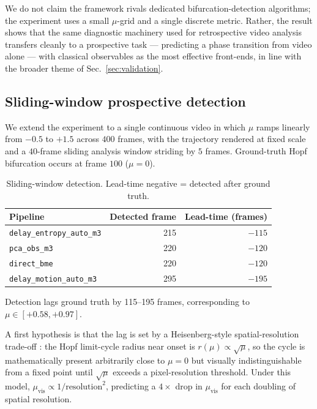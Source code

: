 \documentclass[11pt,a4paper]{article}
\begin{document}
We do not claim the framework rivals dedicated bifurcation-detection
algorithms; the experiment uses a small $\mu$-grid and a single
discrete metric. Rather, the result shows that the same diagnostic
machinery used for retrospective video analysis transfers cleanly to
a prospective task --- predicting a phase transition from video alone
--- with classical observables as the most effective front-ends, in
line with the broader theme of Sec.~\ref{sec:validation}.

\subsection{Sliding-window prospective detection}

We extend the experiment to a single continuous video in which $\mu$
ramps linearly from $-0.5$ to $+1.5$ across $400$ frames, with the
trajectory rendered at fixed scale and a $40$-frame sliding analysis
window striding by $5$ frames. Ground-truth Hopf bifurcation occurs
at frame $100$ ($\mu = 0$).

\begin{table}[h]
\centering
\caption{Sliding-window detection. Lead-time negative = detected
after ground truth.}
\label{tab:sliding-bifurc}
\begin{tabular}{lrr}
\toprule
Pipeline & Detected frame & Lead-time (frames) \\
\midrule
\texttt{delay\_entropy\_auto\_m3} & 215 & $-115$ \\
\texttt{pca\_obs\_m3} & 220 & $-120$ \\
\texttt{direct\_bme} & 220 & $-120$ \\
\texttt{delay\_motion\_auto\_m3} & 295 & $-195$ \\
\bottomrule
\end{tabular}
\end{table}

Detection lags ground truth by 115--195 frames, corresponding to
$\mu \in [+0.58,+0.97]$.

A first hypothesis is that the lag is set by a Heisenberg-style
spatial-resolution trade-off : the Hopf limit-cycle radius near onset
is $r(\mu) \propto \sqrt{\mu}$, so the cycle is mathematically present
arbitrarily close to $\mu=0$ but visually indistinguishable from a
fixed point until $\sqrt{\mu}$ exceeds a pixel-resolution threshold.
Under this model, $\mu_{\text{vis}} \propto 1/\text{resolution}^2$,
predicting a $4\times$ drop in $\mu_{\text{vis}}$ for each doubling of
spatial resolution.
\end{document}

